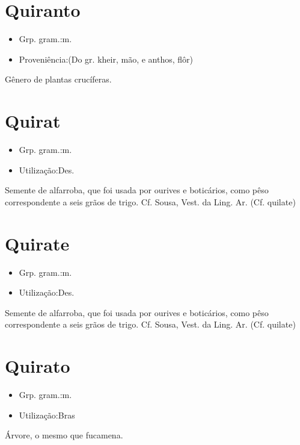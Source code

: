 \section{Quiranto}
\begin{itemize}
\item {Grp. gram.:m.}
\end{itemize}
\begin{itemize}
\item {Proveniência:(Do gr. \textunderscore kheir\textunderscore , mão, e \textunderscore anthos\textunderscore , flôr)}
\end{itemize}
Gênero de plantas crucíferas.
\section{Quirat}
\begin{itemize}
\item {Grp. gram.:m.}
\end{itemize}
\begin{itemize}
\item {Utilização:Des.}
\end{itemize}
Semente de alfarroba, que foi usada por ourives e boticários, como pêso correspondente a seis grãos de trigo. Cf. Sousa, \textunderscore Vest. da Ling. Ar.\textunderscore 
(Cf. \textunderscore quilate\textunderscore )
\section{Quirate}
\begin{itemize}
\item {Grp. gram.:m.}
\end{itemize}
\begin{itemize}
\item {Utilização:Des.}
\end{itemize}
Semente de alfarroba, que foi usada por ourives e boticários, como pêso correspondente a seis grãos de trigo. Cf. Sousa, \textunderscore Vest. da Ling. Ar.\textunderscore 
(Cf. \textunderscore quilate\textunderscore )
\section{Quirato}
\begin{itemize}
\item {Grp. gram.:m.}
\end{itemize}
\begin{itemize}
\item {Utilização:Bras}
\end{itemize}
Árvore, o mesmo que \textunderscore fucamena\textunderscore .
